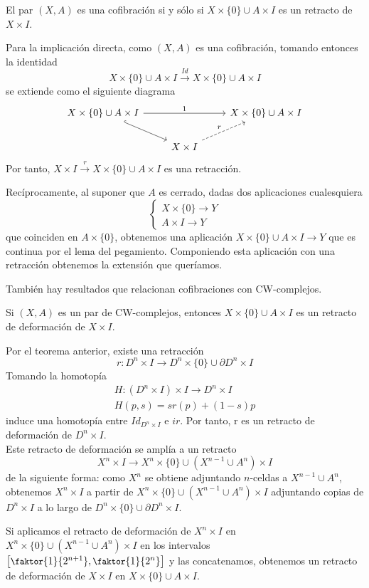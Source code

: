 \begin{teor}
El par $(X, A)$ es una cofibración si y sólo si $X \times \{0\} \cup A \times I$ es un retracto de $X \times I$.
\end{teor}
\begin{demo}
Para la implicación directa, como $(X,A)$ es una cofibración, tomando entonces la identidad 
\[ X \times \{0\} \cup A \times I \stackrel{Id}{\longrightarrow} X \times \{0\} \cup A \times I \]
se extiende como el siguiente diagrama
\[
\begin{tikzcd}
	X \times \{0\} \cup A \times I \arrow{rr}{1} \drar[hook] & & X \times \{0\} \cup A \times I \\
				& X \times I \urar[dashed]{r} &
\end{tikzcd}
\]
Por tanto, $X \times I \stackrel{r}{\longrightarrow} X \times \{0\} \cup A \times I$ es una retracción. \par
Recíprocamente, al suponer que $A$ es cerrado, dadas dos aplicaciones cualesquiera 
\[ \begin{cases}
X \times \{0\} \longrightarrow Y \\
A \times I \longrightarrow Y
\end{cases} \]
que coinciden en $A \times \{0\}$, obtenemos una aplicación $X \times \{0\} \cup A \times I \longrightarrow Y$ que es continua por el lema del pegamiento. Componiendo esta aplicación con una retracción obtenemos la extensión que queríamos.
\end{demo}
También hay resultados que relacionan cofibraciones con CW-complejos.
\begin{teor}
Si $(X, A)$ es un par de CW-complejos, entonces $X \times \{0\} \cup A \times I$ es un retracto de deformación de $X \times I$.
\end{teor}
\begin{demo}
Por el teorema anterior, existe una retracción 
\[r : D^n \times I \longrightarrow D^n \times \{0\} \cup \partial D^n \times I\] 
Tomando la homotopía 
\begin{align*}
H : (D^n \times I) \times I \longrightarrow D^n \times I \\
H(p, s) = s r(p) + (1-s)p
\end{align*}
induce una homotopía entre $Id_{D^n \times I} $ e $ir$. Por tanto, r es un retracto de deformación de $D^n \times I$. \\
Este retracto de deformación se amplía a un retracto 
\[X^n \times I \longrightarrow X^n \times \{0\} \cup (X^{n-1} \cup A^n) \times I \] de la siguiente forma: como $X^n$ se obtiene adjuntando $n$-celdas a $X^{n-1} \cup A^n$, obtenemos $X^n \times I$ a partir de $X^n \times \{0\} \cup (X^{n-1} \cup A^n) \times I$ adjuntando copias de $D^n \times I$ a lo largo de $D^n \times \{0\} \cup \partial D^n \times I$. \par 
Si aplicamos el retracto de deformación de $X^n \times I$ en $X^n \times \{0\} \cup (X^{n-1} \cup A^n) \times I$ en los intervalos ${\small \left[\faktor{1}{2^{n+1}}, \faktor{1}{2^n}\right]}$ y las concatenamos, obtenemos un retracto de deformación de $X \times I$ en $X \times \{0\} \cup A \times I$.
\end{demo}

